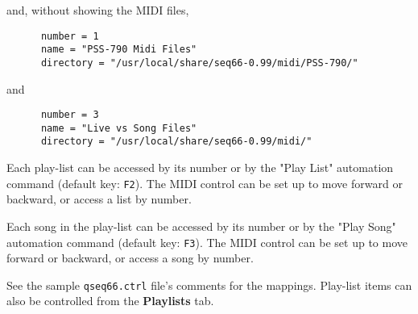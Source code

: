    and, without showing the MIDI files,

   \begin{verbatim}
      number = 1
      name = "PSS-790 Midi Files"
      directory = "/usr/local/share/seq66-0.99/midi/PSS-790/"
   \end{verbatim}

   and

   \begin{verbatim}
      number = 3
      name = "Live vs Song Files"
      directory = "/usr/local/share/seq66-0.99/midi/"
   \end{verbatim}

   Each play-list can be accessed by its number or by the "Play List"
   automation command (default key: \texttt{F2}).
   The MIDI control can be set up to move forward or backward, or access
   a list by number.

   Each song in the play-list can be accessed by its number or
   by the "Play Song" automation command (default key: \texttt{F3}).
   The MIDI control can be set up to move forward or backward, or access
   a song by number.

   See the sample \texttt{qseq66.ctrl} file's comments for the mappings.
   Play-list items can also be controlled from the \textbf{Playlists}
   tab.

